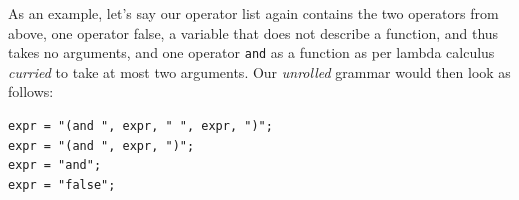 \documentclass{article} %
\begin{document}

As an example, let's say our operator list again contains the two operators from above,
one operator false, a variable that does not describe a function, and thus takes no arguments,
and one operator \verb|and| as a function as per lambda calculus \emph{curried} to take at most two arguments.
%
%
Our \emph{unrolled} grammar would then look as follows:%
    


\begin{verbatim}
expr = "(and ", expr, " ", expr, ")";
expr = "(and ", expr, ")";
expr = "and";
expr = "false";
\end{verbatim}



\end{document}
